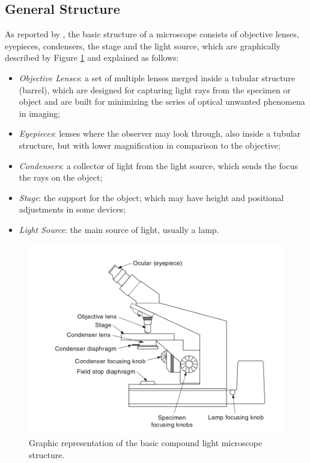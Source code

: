 \subsection{General Structure}

As reported by , the basic structure of a microscope consists of objective lenses, eyepieces, condensers, the stage and the light source, which are graphically described by Figure \ref{fig:compound_microscope} and explained as follows:

\begin{itemize}
    \item \emph{Objective Lenses}: a set of multiple lenses merged inside a tubular structure (barrel), which are designed for capturing light rays from the specimen or object and are built for minimizing the series of optical unwanted phenomena in imaging;

    \item \emph{Eyepieces}: lenses where the observer may look through, also inside a tubular structure, but with lower magnification in comparison to the objective;
    
    \item \emph{Condensers}: a collector of light from the light source, which sends the focus the rays on the object;
    
    \item \emph{Stage}: the support for the object; which may have height and positional adjustments in some devices;
    
    \item \emph{Light Source}: the main source of light, usually a lamp.
\end{itemize}

\begin{figure}[H]
	\centering
	\caption{\label{fig:compound_microscope}Graphic representation of the basic compound light microscope structure.}
	\begin{center}
	    \includegraphics[scale=0.4]{images/fig5.png}
	\end{center}
	\centering
\end{figure}

